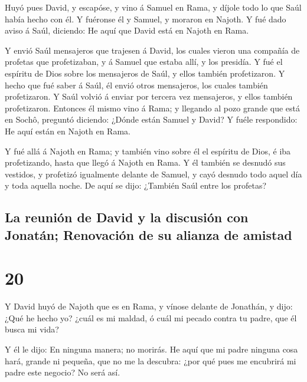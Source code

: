  Huyó pues David, y escapóse, y vino á Samuel en Rama, y
díjole todo lo que Saúl había hecho con él. Y fuéronse él y Samuel, y
moraron en Najoth.  Y fué dado aviso á Saúl, diciendo: He
aquí que David está en Najoth en Rama.

 Y envió Saúl mensajeros que trajesen á David, los cuales
vieron una compañía de profetas que profetizaban, y á Samuel que estaba
allí, y los presidía. Y fué el espíritu de Dios sobre los mensajeros de
Saúl, y ellos también profetizaron.  Y hecho que fué
saber á Saúl, él envió otros mensajeros, los cuales también
profetizaron. Y Saúl volvió á enviar por tercera vez mensajeros, y ellos
también profetizaron.  Entonces él mismo vino á Rama; y
llegando al pozo grande que está en Sochô, preguntó diciendo: ¿Dónde
están Samuel y David? Y fuéle respondido: He aquí están en Najoth en
Rama.

 Y fué allá á Najoth en Rama; y también vino sobre él el
espíritu de Dios, é iba profetizando, hasta que llegó á Najoth en Rama.
 Y él también se desnudó sus vestidos, y profetizó
igualmente delante de Samuel, y cayó desnudo todo aquel día y toda
aquella noche. De aquí se dijo: ¿También Saúl entre los profetas?

\hypertarget{la-reuniuxf3n-de-david-y-la-discusiuxf3n-con-jonatuxe1n-renovaciuxf3n-de-su-alianza-de-amistad}{%
\subsection{La reunión de David y la discusión con Jonatán; Renovación
de su alianza de
amistad}\label{la-reuniuxf3n-de-david-y-la-discusiuxf3n-con-jonatuxe1n-renovaciuxf3n-de-su-alianza-de-amistad}}

\hypertarget{section-09-20}{%
\section{20}\label{section-09-20}}

 Y David huyó de Najoth que es en Rama, y vínose delante
de Jonathán, y dijo: ¿Qué he hecho yo? ¿cuál es mi maldad, ó cuál mi
pecado contra tu padre, que él busca mi vida?

 Y él le dijo: En ninguna manera; no morirás. He aquí que
mi padre ninguna cosa hará, grande ni pequeña, que no me la descubra:
¿por qué pues me encubrirá mi padre este negocio? No será así.

